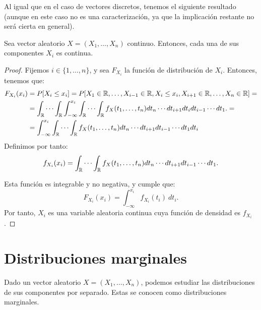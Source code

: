 Al igual que en el caso de vectores discretos, tenemos el siguiente resultado (aunque en este caso no es una caracterización, ya que la implicación restante no será cierta en general).
\begin{teo} \label{teo:caract_cont}
    Sea vector aleatorio $X=(X_1, \ldots, X_n)$ continuo. Entonces, cada una de sus componentes $X_i$ es continua.
\end{teo}
\begin{proof}
    Fijemos $i\in \{1, \ldots, n\}$, y sea $F_{X_i}$ la función de distribución de $X_i$. Entonces, tenemos que:
    \begin{align*}
        F_{X_i}(x_i) &= P[X_i\leq x_i] = P[X_1\in \mathbb{R}, \ldots, X_{i-1}\in \mathbb{R}, X_i\leq x_i, X_{i+1}\in \mathbb{R}, \ldots, X_n\in \mathbb{R}]=\\
        &= \int_{\mathbb{R}} \cdots
        \int_{\mathbb{R}}\int_{-\infty}^{x_i}\int_{\mathbb{R}} \cdots
        \int_{\mathbb{R}}
        f_X(t_1, \ldots, t_n) d t_n \cdots dt_{i+1} dt_i dt_{i-1} \cdots dt_1.
        =\\
        &= \int_{-\infty}^{x_i}\int_{\mathbb{R}} \cdots
        \int_{\mathbb{R}}
        f_X(t_1, \ldots, t_n) d t_n \cdots dt_{i+1} dt_{i-1} \cdots dt_1 dt_i
    \end{align*}
    Definimos por tanto:
    \begin{equation*}
        f_{X_i}(x_i) = \int_{\mathbb{R}} \cdots
        \int_{\mathbb{R}}
        f_X(t_1, \ldots, t_n) d t_n \cdots dt_{i+1} dt_{i-1} \cdots dt_1.
    \end{equation*}

    Esta función es integrable y no negativa, y cumple que:
    \begin{equation*}
        F_{X_i}(x_i) = \int_{-\infty}^{x_i} f_{X_i}(t_i)~d t_i.
    \end{equation*}
    Por tanto, $X_i$ es una variable aleatoria continua cuya función de densidad es $f_{X_i}$.
\end{proof}



\section{Distribuciones marginales}

Dado un vector aleatorio $X=(X_1, \ldots, X_n)$, podemos estudiar las distribuciones de sus componentes por separado. Estas se conocen como distribuciones marginales.

